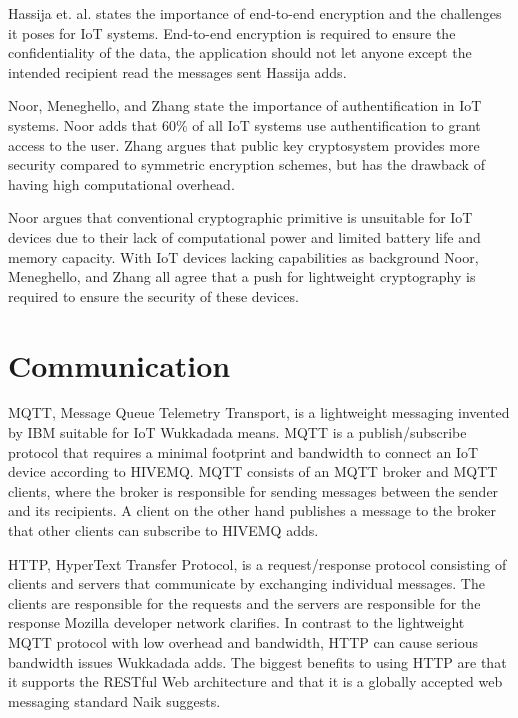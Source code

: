 Hassija et. al. states the importance of end-to-end encryption and the challenges it poses for IoT systems.
End-to-end encryption is required to ensure the confidentiality of the data, the application should not let anyone except the intended recipient read the messages sent Hassija adds.\cite{Hassija2019}

Noor, Meneghello, and Zhang state the importance of authentification in IoT systems.\cite{Noor2019,Meneghello2019,Zhang2014} 
Noor adds that 60\% of all IoT systems use authentification to grant access to the user.\cite{Noor2019}  
Zhang argues that public key cryptosystem provides more security compared to symmetric encryption schemes, but has the drawback of having high computational overhead.\cite{Zhang2014} 

Noor argues that conventional cryptographic primitive is unsuitable for IoT devices due to their lack of computational power and limited battery life and memory capacity.\cite{Noor2019}
With IoT devices lacking capabilities as background Noor, Meneghello, and Zhang all agree that a push for lightweight cryptography is required to ensure the security of these devices.\cite {Noor2019,Meneghello2019,Zhang2014} 

\section{Communication} 
MQTT, Message Queue Telemetry Transport, is a lightweight messaging invented by IBM suitable for IoT Wukkadada means.\cite{Wukkadada2018} 
MQTT is a publish/subscribe protocol that requires a minimal footprint and bandwidth to connect an IoT device according to HIVEMQ.\cite{MQTT2021}
MQTT consists of an MQTT broker and MQTT clients, where the broker is responsible for sending messages between the sender and its recipients.\cite{Wukkadada2018}
A client on the other hand publishes a message to the broker that other clients can subscribe to HIVEMQ adds.\cite{MQTT2021}

HTTP, HyperText Transfer Protocol, is a request/response protocol consisting of clients and servers that communicate by exchanging individual messages. 
The clients are responsible for the requests and the servers are responsible for the response Mozilla developer network clarifies. \cite{HTTP2021} 
In contrast to the lightweight MQTT protocol with low overhead and bandwidth, HTTP can cause serious bandwidth issues Wukkadada adds. \cite{Wukkadada2018}
The biggest benefits to using HTTP are that it supports the RESTful Web architecture and that it is a globally accepted web messaging standard Naik suggests. \cite{Naik2017} 

